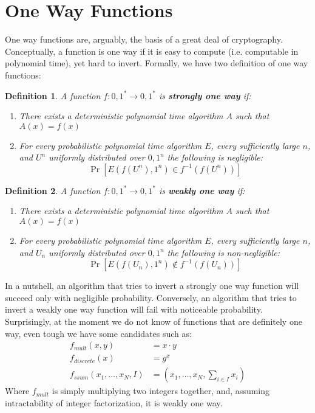 \documentclass{article}
\newtheorem{definition}{Definition}
\begin{document}
\appendix
\section{One Way Functions}
One way functions are, arguably, the basis of a great deal of cryptography.
Conceptually, a function is one way if it is easy to compute (i.e. computable in polynomial time), yet hard to invert.
Formally, we have two definition of one way functions:
\begin{definition}
    A function $f: {0, 1}^* \to {0, 1}^*$ is \textbf{strongly one way} if:
    \begin{enumerate}
        \item There exists a deterministic polynomial time algorithm $A$ such that $A(x) = f(x)$
        \item For every probabilistic polynomial time algorithm $E$, every sufficiently large $n$, and $U^n$ uniformly distributed over ${0, 1}^n$ the following is negligible:
            \[ \Pr[E(f(U^n), 1^n) \in f^{-1}(f(U^n))  ] \]
    \end{enumerate}
\end{definition}
\begin{definition}
    A function $f: {0, 1}^* \to {0, 1}^*$ is \textbf{weakly one way} if:
    \begin{enumerate}
        \item There exists a deterministic polynomial time algorithm $A$ such that $A(x) = f(x)$
        \item For every probabilistic polynomial time algorithm $E$, every sufficiently large $n$, and $U_n$ uniformly distributed over ${0, 1}^n$ the following is non-negligible:
            \[ \Pr[E(f(U_n), 1^n) \notin f^{-1}(f(U_n))  ] \]
    \end{enumerate}
\end{definition}
In a nutshell, an algorithm that tries to invert a strongly one way function will succeed only with negligible probability.
Conversely, an algorithm that tries to invert a weakly one way function will fail with noticeable probability.
Surprisingly, at the moment we do not know of functions that are definitely one way, even tough we have some candidates such as:
\begin{align*}
    f_{mult}(x,y) &=  x \cdot y \\
    f_{discrete}(x) &= g^x \\
    f_{ssum}(x_1, \dots, x_N, I) &= (x_1, \dots, x_N, \sum_{i \in I} x_i)
\end{align*}
Where $f_{mult}$ is simply multiplying two integers together, and, assuming intractability of integer factorization, it is weakly one way.
\end{document}
